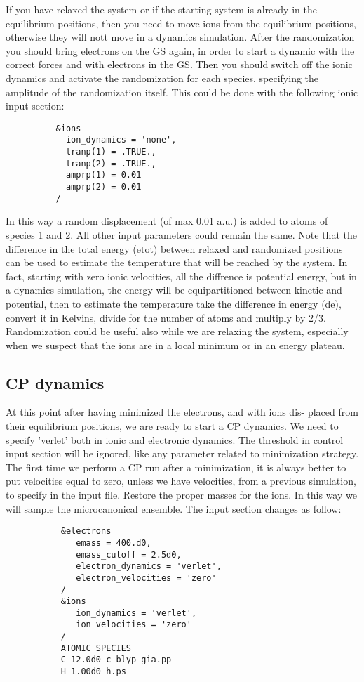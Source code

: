 \documentclass[12pt,a4paper]{article}
\begin{document}
If you have relaxed the system or if the starting system is already in
the equilibrium positions, then you need to move ions from the equilibrium 
positions, otherwise they will nott move in a dynamics simulation.
After the randomization you should bring electrons on the GS again,
in order to start a dynamic with the correct forces and with electrons 
in the GS. Then you should switch off the ionic dynamics and activate 
the randomization for each species, specifying the amplitude of the 
randomization itself. This could be done with the following ionic input 
section:
\begin{verbatim}
          &ions
            ion_dynamics = 'none',
            tranp(1) = .TRUE.,
            tranp(2) = .TRUE.,
            amprp(1) = 0.01
            amprp(2) = 0.01
          /
\end{verbatim}
In this way a random displacement (of max 0.01 a.u.) is added to atoms of 
species 1 and 2. All other input parameters could remain the same.
Note that the difference in the total energy (etot) between relaxed and
randomized positions can be used to estimate the temperature that will
be reached by the system. In fact, starting with zero ionic velocities,
all the diffrence is potential energy, but in a dynamics simulation, the
energy will be equipartitioned between kinetic and potential, then to
estimate the temperature take the difference in energy (de), convert it
in Kelvins, divide for the number of atoms and multiply by 2/3.
Randomization could be useful also while we are relaxing the system,
especially when we suspect that the ions are in a local minimum or in
an energy plateau.

\subsection{CP dynamics}

At this point after having minimized the electrons, and with ions dis-
placed from their equilibrium positions, we are ready to start a CP
dynamics. We need to specify 'verlet' both in ionic and electronic
dynamics. The threshold in control input section will be ignored, like
any parameter related to minimization strategy. The first time we perform 
a CP run after a minimization, it is always better to put velocities equal
to zero, unless we have velocities, from a previous simulation, to
specify in the input file. Restore the proper masses for the ions. In this
way we will sample the microcanonical ensemble. The input section
changes as follow:
\begin{verbatim}
           &electrons
              emass = 400.d0,
              emass_cutoff = 2.5d0,
              electron_dynamics = 'verlet',
              electron_velocities = 'zero'
           /
           &ions
              ion_dynamics = 'verlet',
              ion_velocities = 'zero'
           /
           ATOMIC_SPECIES
           C 12.0d0 c_blyp_gia.pp
           H 1.00d0 h.ps
\end{verbatim}
\end{document}
